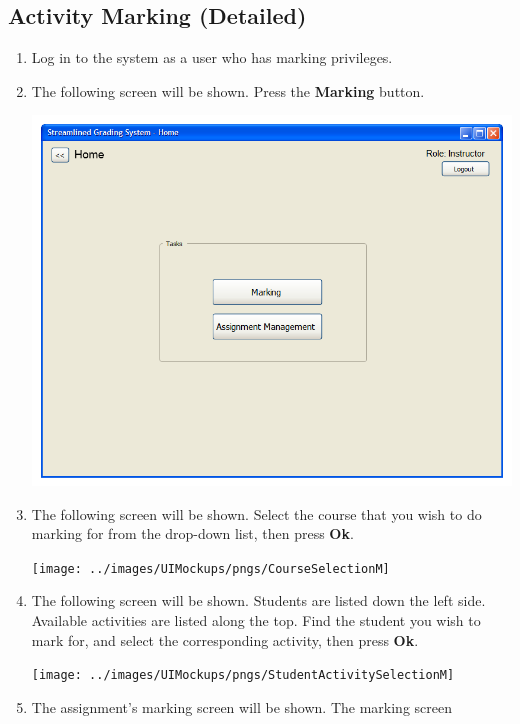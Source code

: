 \documentclass{article}
\begin{document}
\subsection{Activity Marking (Detailed)}
\begin{enumerate}
  \item Log in to the system as a user who has marking privileges.
  \item The following screen will be shown.  Press the \textbf{Marking} button.
  \begin{center} 
   \includegraphics[scale=0.55]{../images/UIMockups/pngs/LandingPage}
  \end{center}
  \item The following screen will be shown.  Select the course that you wish
    to do marking for from the drop-down list, then press \textbf{Ok}.
    \begin{center} 
     \texttt{[image: ../images/UIMockups/pngs/CourseSelectionM]}
     \label{courseSel}
    \end{center}
  \item The following screen will be shown.  Students are listed down the left
    side. Available activities are listed along the top.  Find the student you
    wish to mark for, and select the corresponding activity, then press \textbf{Ok}.
  \begin{center} 
    \texttt{[image: ../images/UIMockups/pngs/StudentActivitySelectionM]}
    \label{actSel}
  \end{center}
  \item The assignment's marking screen will be shown.  The marking screen

\end{enumerate}
\end{document}
